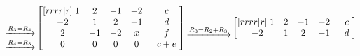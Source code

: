 \documentclass[a4paper]{article}
\begin{document}
\begin{enumerate}[label=\textbf{\arabic*.}]
\begin{enumerate}
				$$
				\begin{matrix}
					~\\
					~\\
					\xrightarrow{R_3 = R_4} \\
					\xrightarrow{R_4 = R_3} \\
				\end{matrix}
				\begin{bmatrix}[rrrr|r]
					\hspace{1mm} 1 & 2 & -1 & -2 \hspace{1mm} & \hspace{1mm} c \hspace{1mm}\\
					\hspace{1mm}-2 & 1 & 2 & -1 \hspace{1mm} & \hspace{1mm} d \hspace{1mm}\\
					\hspace{1mm} 2 & -1 & -2 & x \hspace{1mm} & \hspace{1mm} f \hspace{1mm}\\
					\hspace{1mm} 0 & 0 & 0 & 0 \hspace{1mm} & \hspace{1mm} c + e \hspace{1mm}\\
				\end{bmatrix}
				\begin{matrix}
					~\\
					~\\
					\xrightarrow{R_3 = R_2 + R_3} \\
					~\\
				\end{matrix}
				\begin{bmatrix}[rrrr|r]
					\hspace{1mm} 1 & 2 & -1 & -2 \hspace{1mm} & \hspace{1mm} c \hspace{1mm}\\
					\hspace{1mm}-2 & 1 & 2 & -1 \hspace{1mm} & \hspace{1mm} d \hspace{1mm}\\

\end{bmatrix}$$
\end{enumerate}
\end{enumerate}
\end{document}
